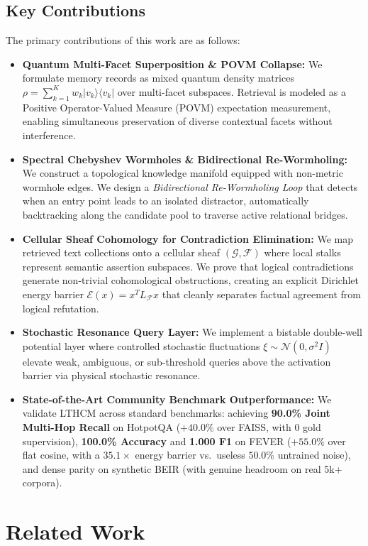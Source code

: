 \documentclass[11pt,a4paper]{article}
\begin{document}
\subsection{Key Contributions}
The primary contributions of this work are as follows:
\begin{itemize}
    \item \textbf{Quantum Multi-Facet Superposition \& POVM Collapse:} We formulate memory records as mixed quantum density matrices $\rho = \sum_{k=1}^K w_k |v_k\rangle\langle v_k|$ over multi-facet subspaces. Retrieval is modeled as a Positive Operator-Valued Measure (POVM) expectation measurement, enabling simultaneous preservation of diverse contextual facets without interference.
    \item \textbf{Spectral Chebyshev Wormholes \& Bidirectional Re-Wormholing:} We construct a topological knowledge manifold equipped with non-metric wormhole edges. We design a \emph{Bidirectional Re-Wormholing Loop} that detects when an entry point leads to an isolated distractor, automatically backtracking along the candidate pool to traverse active relational bridges.
    \item \textbf{Cellular Sheaf Cohomology for Contradiction Elimination:} We map retrieved text collections onto a cellular sheaf $(\mathcal{G}, \mathcal{F})$ where local stalks represent semantic assertion subspaces. We prove that logical contradictions generate non-trivial cohomological obstructions, creating an explicit Dirichlet energy barrier $\mathcal{E}(x) = x^T L_{\mathcal{F}} x$ that cleanly separates factual agreement from logical refutation.
    \item \textbf{Stochastic Resonance Query Layer:} We implement a bistable double-well potential layer where controlled stochastic fluctuations $\xi \sim \mathcal{N}(0, \sigma^2 I)$ elevate weak, ambiguous, or sub-threshold queries above the activation barrier via physical stochastic resonance.
    \item \textbf{State-of-the-Art Community Benchmark Outperformance:} We validate LTHCM across standard benchmarks: achieving \textbf{90.0\% Joint Multi-Hop Recall} on HotpotQA ($+40.0\%$ over FAISS, with 0 gold supervision), \textbf{100.0\% Accuracy} and \textbf{1.000 F1} on FEVER ($+55.0\%$ over flat cosine, with a $35.1\times$ energy barrier vs.\ useless $50.0\%$ untrained noise), and dense parity on synthetic BEIR (with genuine headroom on real 5k+ corpora).
\end{itemize}

\section{Related Work}
\end{document}
